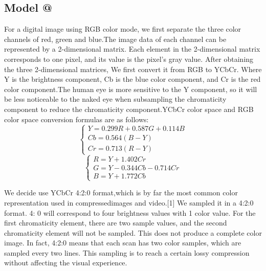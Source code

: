 \documentclass{mcmthesis}
\makeatletter
\newcommand{\Rmnum}[1]{\expandafter\@slowromancap\romannumeral #1@}
\makeatother
\begin{document}
\subsection{Model \Rmnum{1}}
For a digital image using RGB color mode, we first separate the three color channels of red, green and blue.The image data of each channel can be represented by a 2-dimensional matrix. Each element in the 2-dimensional matrix corresponds to one pixel, and its value is the pixel's gray value. After obtaining the three 2-dimensional matrices, We first convert it from RGB to YCbCr. Where Y is the brightness component, Cb is the blue color component, and Cr is the red color component.The human eye is more sensitive to the Y component, so it will be less noticeable to the naked eye when subsampling the chromaticity component to reduce the chromaticity component.YCbCr color space and RGB color space conversion formulas are as follows:
\begin{equation}
\begin{cases}Y=0.299R+0.587G+0.114B\\Cb=0.564(B-Y)\\Cr=0.713(R-Y)\end{cases}
\end{equation}
\begin{equation}
\begin{cases}R=Y+1.402Cr\\G=Y-0.344Cb-0.714Cr\\B=Y+1.772Cb\end{cases}
\end{equation}


We decide use YCbCr 4:2:0 format,which is by far the most common color representation used in compressedimages and video.[1] 
We sampled it in a 4:2:0 format. 4: 0 will correspond to four brightness values with 1 color value. For the first chromaticity element, there are two sample values, and the second chromaticity element will not be sampled. This does not produce a complete color image. In fact, 4:2:0 means that each scan has two color samples, which are sampled every two lines.
This sampling is to reach a certain lossy compression without affecting the visual experience.
\end{document}
